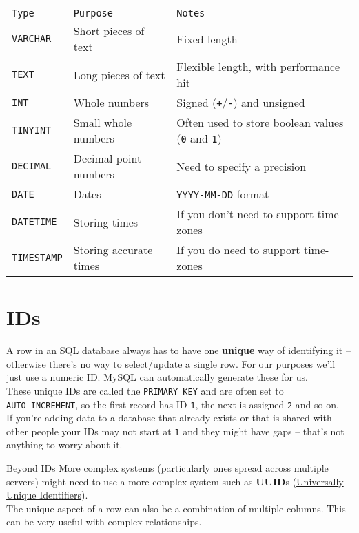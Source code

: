 \begin{small}
    \begin{tabu}{l l X}
        \texttt{Type}       & \texttt{Purpose}       & \texttt{Notes} \\
        \texttt{VARCHAR}    & Short pieces of text   & Fixed length  \\
        \texttt{TEXT}       & Long pieces of text    & Flexible length, with performance hit  \\
        \texttt{INT}        & Whole numbers          & Signed (\texttt{+}/\texttt{-}) and unsigned  \\
        \texttt{TINYINT}    & Small whole numbers    & Often used to store boolean values (\texttt{0} and \texttt{1})  \\
        \texttt{DECIMAL}    & Decimal point numbers  & Need to specify a precision \\
        \texttt{DATE}       & Dates                  & \texttt{YYYY-MM-DD} format  \\
        \texttt{DATETIME}   & Storing times          & If you don't need to support time-zones \\
        \texttt{TIMESTAMP}  & Storing accurate times & If you do need to support time-zones \\
    \end{tabu}
\end{small}
\par\bigskip


\section{IDs}

A row in an SQL database always has to have one \textbf{unique} way of identifying it – otherwise there's no way to select/update a single row. For our purposes we'll just use a numeric ID. MySQL can automatically generate these for us.
\\

These unique IDs are called the \texttt{PRIMARY KEY} and are often set to \texttt{AUTO\_INCREMENT}, so the first record has ID \texttt{1}, the next is assigned \texttt{2} and so on.
\\

If you're adding data to a database that already exists or that is shared with other people your IDs may not start at \texttt{1} and they might have gaps – that's not anything to worry about it.

\begin{infobox}{Beyond IDs}
    More complex systems (particularly ones spread across multiple servers) might need to use a more complex system such as \textbf{UUID}s (\href{https://en.wikipedia.org/wiki/Universally\_unique\_identifier}{Universally Unique Identifiers}).
    \\

    The unique aspect of a row can also be a combination of multiple columns. This can be very useful with complex relationships.
\end{infobox}

